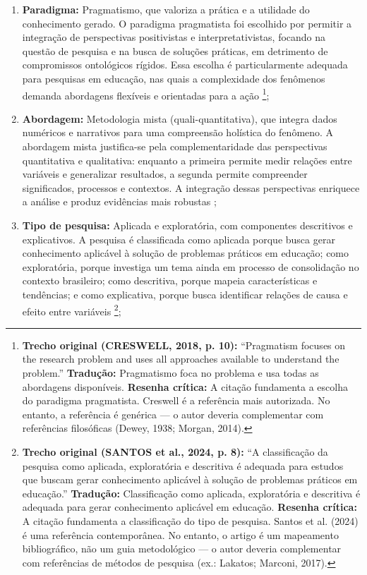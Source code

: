 \begin{enumerate}
    \item \textbf{Paradigma:} Pragmatismo, que valoriza a prática e a utilidade do conhecimento gerado. O paradigma pragmatista foi escolhido por permitir a integração de perspectivas positivistas e interpretativistas, focando na questão de pesquisa e na busca de soluções práticas, em detrimento de compromissos ontológicos rígidos. Essa escolha é particularmente adequada para pesquisas em educação, nas quais a complexidade dos fenômenos demanda abordagens flexíveis e orientadas para a ação \cite{CRESWELL2018}\footnote{\textbf{Trecho original (CRESWELL, 2018, p. 10):} ``Pragmatism focuses on the research problem and uses all approaches available to understand the problem.'' \textbf{Tradução:} Pragmatismo foca no problema e usa todas as abordagens disponíveis. \textbf{Resenha crítica:} A citação fundamenta a escolha do paradigma pragmatista. Creswell é a referência mais autorizada. No entanto, a referência é genérica — o autor deveria complementar com referências filosóficas (Dewey, 1938; Morgan, 2014).};
    \item \textbf{Abordagem:} Metodologia mista (quali-quantitativa), que integra dados numéricos e narrativos para uma compreensão holística do fenômeno. A abordagem mista justifica-se pela complementaridade das perspectivas quantitativa e qualitativa: enquanto a primeira permite medir relações entre variáveis e generalizar resultados, a segunda permite compreender significados, processos e contextos. A integração dessas perspectivas enriquece a análise e produz evidências mais robustas \cite{CRESWELL2018};
    \item \textbf{Tipo de pesquisa:} Aplicada e exploratória, com componentes descritivos e explicativos. A pesquisa é classificada como aplicada porque busca gerar conhecimento aplicável à solução de problemas práticos em educação; como exploratória, porque investiga um tema ainda em processo de consolidação no contexto brasileiro; como descritiva, porque mapeia características e tendências; e como explicativa, porque busca identificar relações de causa e efeito entre variáveis \cite{SANTOS2024}\footnote{\textbf{Trecho original (SANTOS et al., 2024, p. 8):} ``A classificação da pesquisa como aplicada, exploratória e descritiva é adequada para estudos que buscam gerar conhecimento aplicável à solução de problemas práticos em educação.'' \textbf{Tradução:} Classificação como aplicada, exploratória e descritiva é adequada para gerar conhecimento aplicável em educação. \textbf{Resenha crítica:} A citação fundamenta a classificação do tipo de pesquisa. Santos et al. (2024) é uma referência contemporânea. No entanto, o artigo é um mapeamento bibliográfico, não um guia metodológico — o autor deveria complementar com referências de métodos de pesquisa (ex.: Lakatos; Marconi, 2017).};

\end{enumerate}
